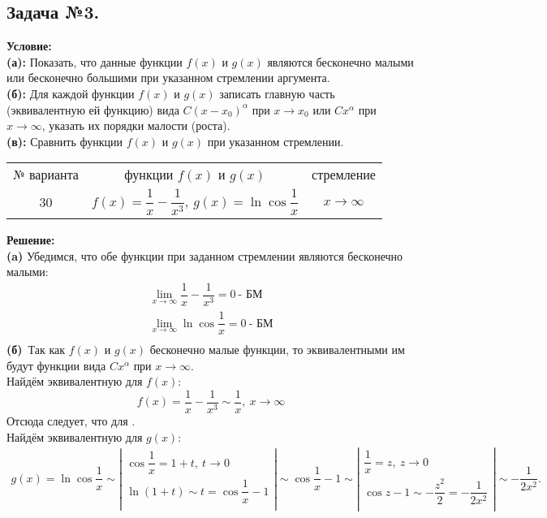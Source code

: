\subsection*{\center Задача №3.}
\textbf{Условие:}\\
\textbf{(а):} Показать, что данные функции
$f(x)$ и $g(x)$ являются бесконечно малыми или бесконечно большими
при указанном стремлении аргумента. \\
\textbf{(б):} Для каждой функции $f(x)$ и $g(x)$ записать главную часть
(эквивалентную ей функцию)  вида $C(x-x_0)^{\alpha}$ при $x\rightarrow x_0$ или $Cx^{\alpha}$
при $x\rightarrow\infty$, указать их порядки малости (роста). \\
\textbf{(в):} Сравнить функции $f(x)$ и $g(x)$ при указанном стремлении.
\begin{center}
	\begin{tabular}{|c|c|c|}
		\hline
		№ варианта & функции $f(x)$ и $g(x)$ & стремление \\[6pt]
		30 & $f(x) =\dfrac{1}{x}-\dfrac{1}{x^3},~g(x)=\ln{\cos{\dfrac{1}{x}}}$ & $x\rightarrow\infty$ \\ [6pt]
		\hline 
	\end{tabular}
\end{center}
\textbf{Решение:}\\
\textbf{(a)}
Убедимся, что обе функции при заданном стремлении являются бесконечно малыми:
$$
\begin{array}{l}
	\lim\limits_{x\to\infty}\dfrac{1}{x}-\dfrac{1}{x^3} = 0 ~ \text{- БМ} \\ [12pt]
	\lim\limits_{x\to\infty}\ln{\cos{\dfrac{1}{x}}} = 0 ~ \text{- БМ} \\
\end{array}
$$
\textbf{(б)}~Так как $f(x)$ и $g(x)$ бесконечно малые функции, то эквивалентными им будут функции вида 
$Cx^{\alpha}$ при $x\rightarrow\infty$.\\ Найдём эквивалентную для $f(x)$:
$$
f(x) = \dfrac{1}{x}-\dfrac{1}{x^3} \sim \dfrac{1}{x}, ~ x \to \infty 
$$ 
Отсюда следует, что для .\\
Найдём эквивалентную для $g(x)$:
$$
\begin{array}{l}
g(x) = \ln{\cos{\dfrac{1}{x}}} \sim \left| 
\begin{array}{l}
	\cos{\dfrac{1}{x}} = 1 + t, ~ t \to 0 \\ [10pt]
	\ln{(1+t)} \sim t = \cos{\dfrac{1}{x}} - 1 \\ [10pt] 
\end{array} \right|
\sim \cos{\dfrac{1}{x}} - 1 \sim \left|
\begin{array}{l}
	\dfrac{1}{x} = z, ~ z \to 0 \\[10pt]
	\cos{z} - 1 \sim -\dfrac{z^2}{2} = -\dfrac{1}{2x^2}\\
\end{array} \right|
\sim -\dfrac{1}{2x^2}.
\end{array}
$$
